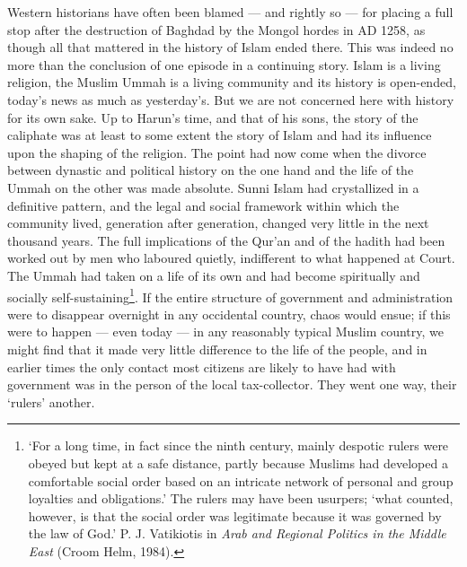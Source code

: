 \documentclass[10pt, twoside,openright]{book}
\begin{document}
Western historians have often been blamed --- and rightly so --- for placing a full stop after the 
destruction of Baghdad by the Mongol hordes in AD 1258, as though all that mattered in the history of 
Islam ended there. This was indeed no more than the conclusion of one episode in a continuing story. 
Islam is a living religion, the Muslim Ummah is a living community and its history is open-ended, 
today's news as much as yesterday's. But we are not concerned here with history for its own sake. Up 
to Harun's time, and that of his sons, the story of the caliphate was at least to some extent the 
story of Islam and had its influence upon the shaping of the religion. The point had now come when 
the divorce between dynastic and political history on the one hand and the life of the Ummah on the 
other was made absolute. Sunni Islam had crystallized in a definitive pattern, and the legal and 
social framework within which the community lived, generation after generation, changed very little 
in the next thousand years. The full implications of the Qur'an and of the hadith had been worked out 
by men who laboured quietly, indifferent to what happened at Court. The Ummah had taken on a life of 
its own and had become spiritually and socially self\hyp{}sustaining\footnote{`For a long time, in fact since the ninth century, mainly despotic rulers were obeyed but kept at a safe distance, partly because Muslims had developed a comfortable social order based on an intricate network of personal and group loyalties and obligations.' The rulers may have been usurpers; `what counted, however, is that the social order was legitimate because it was governed by the law of God.' P. J. Vatikiotis in \emph{Arab and Regional Politics in the Middle East} (Croom Helm, 1984).}. If the entire structure of government and administration were to disappear overnight in any occidental country, chaos would ensue; if this were to happen --- even today --- in any reasonably typical Muslim country, we might find that it made very little difference to the life of the people, and in earlier times the only contact most citizens are likely to have had with government was in the person of the local tax\hyp{}collector. They went one way, their `rulers' another. \\
\end{document}
